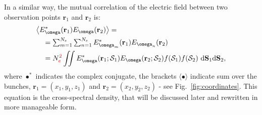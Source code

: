 \documentclass{iucr}              %
\newcommand{\todo}[1]{{\color{red}[TODO: "#1'']}}
\newcommand{\inred}[1]{{\color{red}#1}}
\begin{document}

In a similar way, the mutual correlation of the electric field between two observation points $\textbf{r}_1$ and $\textbf{r}_2$ is:
\begin{equation}\label{eq:CSDallaChubar}
\begin{split}
      &\big\langle E^*_{\omega}(\textbf{r}_1) E_{\omega}(\textbf{r}_2)\big\rangle = \\
      &\quad = \sum_{m=1}^{N_e} \sum_{n=1}^{N_e} E^*_{\omega_{m}}(\textbf{r}_1) E_{\omega_{n}}(\textbf{r}_2)\\
      &\quad = N_e^\inred{2}\iint
      E^*_{\omega}(\textbf{r}_1;\mathcal{S}_1)
      E_{\omega}(\textbf{r}_2;\mathcal{S}_2)
      f(\mathcal{S}_1) f(\mathcal{S}_2)~
      \text{d}\textbf{S}_1 \text{d}\textbf{S}_2,
\end{split}
\end{equation}
where $\bullet^*$ indicates the complex conjugate, the brackets $\langle \bullet \rangle$ indicate sum over the bunches, $\textbf{r}_1=(x_1,y_1,z_1)$ and $\textbf{r}_2=(x_2,y_2,z_2)$ - see Fig.~\ref{fig:coordinates}. This equation is the cross-spectral density, that will be discussed later and rewritten in more manageable form.

\end{document}
